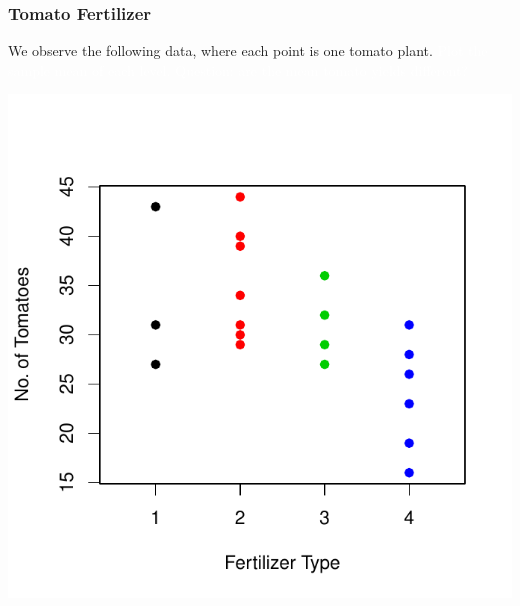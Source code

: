 \documentclass[handout]{beamer}
\begin{document}
\begin{frame}
\frametitle{Tomato Fertilizer}
We observe the following data, where each point is one tomato plant. \textcolor{white}{Plot the sample mean of each level.} \textcolor{white}{Question: are the mean tomato yields different?}  
\begin{center}
\includegraphics{figure/lec22-003}
\end{center}
\end{frame}
\end{document}
